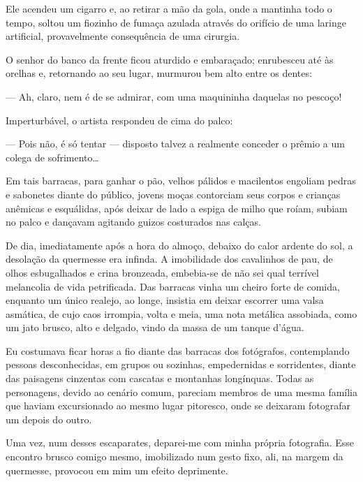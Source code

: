 Ele acendeu um cigarro e, ao retirar a mão da gola, onde a mantinha todo o tempo, soltou um fiozinho de fumaça azulada através do orifício de uma laringe artificial, provavelmente consequência de uma cirurgia. 

O senhor do banco da frente ficou aturdido e embaraçado; enrubesceu até às orelhas e, retornando ao seu lugar, murmurou bem alto entre os dentes: 

--- Ah, claro, nem é de se admirar, com uma maquininha daquelas no pescoço!

Imperturbável, o artista respondeu de cima do palco:

--- Pois não, é só tentar --- disposto talvez a realmente conceder o prêmio a um colega de sofrimento\ldots{}

Em tais barracas, para ganhar o pão, velhos pálidos e macilentos engoliam pedras e sabonetes diante do público, jovens moças contorciam seus corpos e crianças anêmicas e esquálidas, após deixar de lado a espiga de milho que roíam, subiam no palco e dançavam agitando guizos costurados nas calças.

De dia, imediatamente após a hora do almoço, debaixo do calor ardente do sol, a desolação da quermesse era infinda. A imobilidade dos cavalinhos de pau, de olhos esbugalhados e crina bronzeada, embebia-se de não sei qual terrível melancolia de vida petrificada. Das barracas vinha um cheiro forte de comida, enquanto um único realejo, ao longe, insistia em deixar escorrer uma valsa asmática, de cujo caos irrompia, volta e meia, uma nota metálica assobiada, como um jato brusco, alto e delgado, vindo da massa de um tanque d'água.

Eu costumava ficar horas a fio diante das barracas dos fotógrafos, contemplando pessoas desconhecidas, em grupos ou sozinhas, empedernidas e sorridentes, diante das paisagens cinzentas com cascatas e montanhas longínquas. Todas as personagens, devido ao cenário comum, pareciam membros de uma mesma família que haviam excursionado ao mesmo lugar pitoresco, onde se deixaram fotografar um depois do outro.

Uma vez, num desses escaparates, deparei-me com minha própria fotografia. Esse encontro brusco comigo mesmo, imobilizado num gesto fixo, ali, na margem da quermesse, provocou em mim um efeito deprimente.

